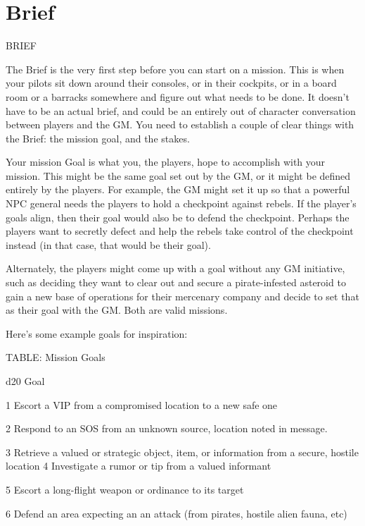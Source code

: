 \section{Brief}
                                                     BRIEF


The Brief is the very first step before you can start on a mission. This is when your pilots sit down
around their consoles, or in their cockpits, or in a board room or a barracks somewhere and
figure out what needs to be done. It doesn’t have to be an actual brief, and could be an entirely
out of character conversation between players and the GM. You need to establish a couple of
clear things with the Brief: the mission goal, and the stakes.


Your mission Goal is what you, the players, hope to accomplish with your mission. This might be
the same goal set out by the GM, or it might be defined entirely by the players. For example, the
GM might set it up so that a powerful NPC general needs the players to hold a checkpoint
against rebels. If the player’s goals align, then their goal would also be to defend the checkpoint.
Perhaps the players want to secretly defect and help the rebels take control of the checkpoint
instead (in that case, that would be their goal).


Alternately, the players might come up with a goal without any GM initiative, such as deciding
they want to clear out and secure a pirate-infested asteroid to gain a new base of operations for
their mercenary company and decide to set that as their goal with the GM. Both are valid
missions.





Here’s some example goals for inspiration:


TABLE: Mission Goals


 d20       Goal

 1         Escort a VIP from a compromised location to a new safe one

 2         Respond to an SOS from an unknown source, location noted in message.

 3         Retrieve a valued or strategic object, item, or information from a secure, hostile
           location
 4         Investigate a rumor or tip from a valued informant

 5         Escort a long-flight weapon or ordinance to its target

 6         Defend an area expecting an an attack (from pirates, hostile alien fauna, etc)

